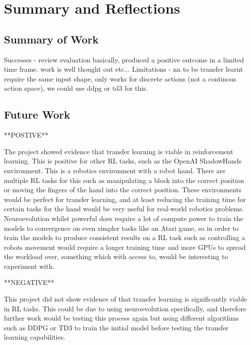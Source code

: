 \chapter{Summary and Reflections}

\label{ch:summary}

\section{Summary of Work}

Successes - review evaluation basically, produced a positive outcome in a limited time frame. work is well thought out etc...
Limitations - nn to be transfer learnt require the same input shape, only works for discrete actions (not a continous action space), we could use ddpg or td3 for this.

\section{Future Work}

**POSTIVE**

The project showed evidence that transfer learning is viable in reinforcement learning. This is positive for other RL tasks, such as the OpenAI ShadowHands environment. This is a robotics environment with a robot hand. There are multiple RL tasks for this such as manipulating a block into the correct position or moving the fingers of the hand into the correct position. These environments would be perfect for transfer learning, and at least reducing the training time for certain tasks for the hand would be very useful for real-world robotics problems. Neuroevolution whilst powerful does require a lot of compute power to train the models to convergence on even simpler tasks like an Atari game, so in order to train the models to produce consistent results on a RL task such as controlling a robots movement would require a longer training time and more GPUs to spread the workload over, something which with access to, would be interesting to experiment with.

**NEGATIVE**

This project did not show evidence of that transfer learning is significantly viable in RL tasks. This could be due to using neuroevolution specifically, and therefore further work would be testing this process again but using different algorithms such as DDPG or TD3 to train the initial model before testing the transfer learning capabilities.

